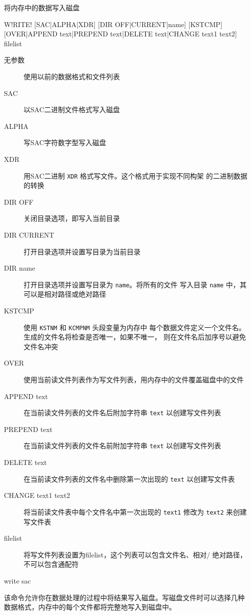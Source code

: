 \label{cmd:write}

将内存中的数据写入磁盘

\begin{SACSTX}
W!RITE! [SAC|ALPHA|XDR] [DIR OFF|CURRENT|name] [KSTCMP]
    [OVER|APPEND text|PREPEND text|DELETE text|CHANGE text1 text2] filelist
\end{SACSTX}

\begin{description}
\item [无参数] 使用以前的数据格式和文件列表
\item [SAC] 以SAC二进制文件格式写入磁盘
\item [ALPHA] 写SAC字符数字型写入磁盘
\item [XDR] 用SAC二进制 \texttt{XDR} 格式写文件。这个格式用于实现不同构架
    的二进制数据的转换
\item [DIR OFF] 关闭目录选项，即写入当前目录
\item [DIR CURRENT] 打开目录选项并设置写目录为当前目录
\item [DIR name] 打开目录选项并设置写目录为 \texttt{name}。将所有的文件
    写入目录 \texttt{name} 中，其可以是相对路径或绝对路径
\item [KSTCMP] 使用 \texttt{KSTNM} 和 \texttt{KCMPNM} 头段变量为内存中
    每个数据文件定义一个文件名。生成的文件名将检查是否唯一，如果不唯一，
    则在文件名后加序号以避免文件名冲突
\item [OVER] 使用当前读文件列表作为写文件列表，用内存中的文件覆盖磁盘中的文件
\item [APPEND text] 在当前读文件列表的文件名后附加字符串 \texttt{text}
    以创建写文件列表
\item [PREPEND text] 在当前读文件列表的文件名前附加字符串 \texttt{text}
    以创建写文件列表
\item [DELETE text] 在当前读文件列表的文件名中删除第一次出现的 \texttt{text}
    以创建写文件表
\item [CHANGE text1 text2] 将当前读文件表中每个文件名中第一次出现的 \texttt{text1}
    修改为 \texttt{text2} 来创建写文件表
\item [filelist] 将写文件列表设置为filelist，这个列表可以包含文件名、相对/
    绝对路径，不可以包含通配符
\end{description}

\begin{SACDFT}
write sac
\end{SACDFT}

该命令允许你在数据处理的过程中将结果写入磁盘。写磁盘文件时可以选择几种
数据格式，内存中的每个文件都将完整地写入到磁盘中。

